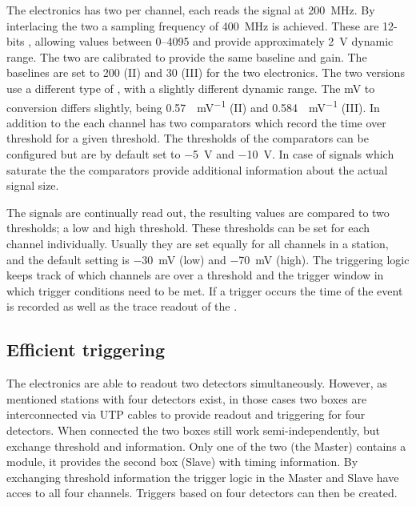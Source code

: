 The \hisparc electronics has two \adcs per channel, each reads the \pmt signal at \SI{200}{\mega\hertz}. By interlacing the two \adcs a sampling frequency of \SI{400}{\mega\hertz} is achieved. These are 12-bits \adcs, allowing values between \SIrange{0}{4095}{\adc} and provide approximately \SI{2}{\volt} dynamic range. The two \adcs are calibrated to provide the same baseline and gain. The baselines are set to \SI{200}{\adc} (II) and \SI{30}{\adc} (III) for the two \hisparc electronics. The two versions use a different type of \adc, with a slightly different dynamic range. The \si{\mV} to \si{\adc} conversion differs slightly, being \SI{0.57}{\adc\per\mV} (II) and \SI{0.584}{\adc\per\mV} (III). In addition to the \adcs each channel has two comparators which record the time over threshold for a given threshold. The thresholds of the comparators can be configured but are by default set to \SI{-5}{\volt} and \SI{-10}{\volt}. In case of signals which saturate the \adcs the comparators provide additional information about the actual signal size.

The \pmt signals are continually read out, the resulting \adc values are compared to two thresholds; a low and high threshold. These thresholds can be set for each channel individually. Usually they are set equally for all channels in a station, and the default setting is \SI{-30}{\milli\volt} (low) and \SI{-70}{\milli\volt} (high). The triggering logic keeps track of which channels are over a threshold and the trigger window in which trigger conditions need to be met. If a trigger occurs the time of the event is recorded as well as the trace readout of the \adc.

\subsection{Efficient triggering}

The \hisparc electronics are able to readout two detectors simultaneously. However, as mentioned stations with four detectors exist, in those cases two boxes are interconnected via UTP cables to provide readout and triggering for four detectors. When connected the two boxes still work semi-independently, but exchange threshold and \gps information. Only one of the two (the Master) contains a \gps module, it provides the second box (Slave) with \gps timing information. By exchanging threshold information the trigger logic in the Master and Slave have acces to all four channels. Triggers based on four detectors can then be created.

